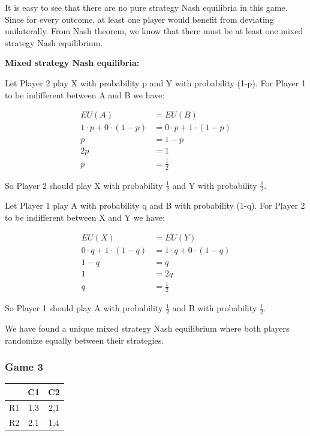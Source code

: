 \documentclass[10pt]{article}
\begin{document}
It is easy to see that there are no pure strategy Nash equilibria in this game. Since for every outcome, at least one player would benefit from deviating unilaterally. From Nash theorem, we know that there must be at least one mixed strategy Nash equilibrium.

\noindent
\textbf{Mixed strategy Nash equilibria:}

Let Player 2 play X with probability p and Y with probability (1-p). For Player 1 to be indifferent between A and B we have:

\begin{align*}
EU(A) &= EU(B) \\
1 \cdot p + 0 \cdot (1-p) &= 0 \cdot p + 1 \cdot (1-p) \\
p &= 1 - p \\
2p &= 1 \\
p &= \frac{1}{2}
\end{align*}

So Player 2 should play X with probability $\frac{1}{2}$ and Y with probability $\frac{1}{2}$.

Let Player 1 play A with probability q and B with probability (1-q). For Player 2 to be indifferent between X and Y we have:

\begin{align*}
EU(X) &= EU(Y) \\
0 \cdot q + 1 \cdot (1-q) &= 1 \cdot q + 0 \cdot (1-q) \\
1 - q &= q \\
1 &= 2q \\
q &= \frac{1}{2}
\end{align*}

So Player 1 should play A with probability $\frac{1}{2}$ and B with probability $\frac{1}{2}$.

We have found a unique mixed strategy Nash equilibrium where both players randomize equally between their strategies.

\subsubsection*{Game 3}

\begin{tabular}{c|c|c}
& C1 & C2 \\
\hline
R1 & 1,3 & 2,1 \\
\hline
R2 & 2,1 & 1,4 \\
\end{tabular}\\
\end{document}
